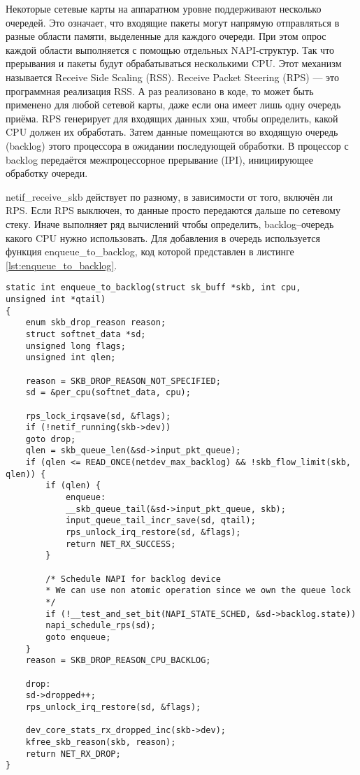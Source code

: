 Некоторые сетевые карты на аппаратном уровне поддерживают несколько очередей. Это означает, что входящие пакеты могут напрямую отправляться в разные области памяти, выделенные для каждого очереди. При этом опрос каждой области выполняется с помощью отдельных NAPI-структур. Так что прерывания и пакеты будут обрабатываться несколькими CPU. Этот механизм называется Receive Side Scaling (RSS). Receive Packet Steering (RPS) --- это программная реализация RSS. А раз реализовано в коде, то может быть применено для любой сетевой карты, даже если она имеет лишь одну очередь приёма. RPS генерирует для входящих данных хэш, чтобы определить, какой CPU должен их обработать. Затем данные помещаются во входящую очередь (backlog) этого процессора в ожидании последующей обработки. В процессор с backlog передаётся межпроцессорное прерывание (IPI), инициирующее обработку очереди.

netif\_receive\_skb действует по разному, в зависимости от того, включён ли RPS. Если RPS выключен, то данные просто передаются дальше по сетевому стеку. Иначе выполняет ряд вычислений чтобы определить, backlog--очередь какого CPU нужно использовать. Для добавления в очередь используется функция enqueue\_to\_backlog, код которой представлен в листинге \ref{lst:enqueue_to_backlog}.

\begin{center}
	\captionsetup{justification=raggedright,singlelinecheck=off}
	\begin{lstlisting}[label=lst:enqueue_to_backlog,caption=Код функции enqueue\_to\_backlog,showstringspaces=false]
static int enqueue_to_backlog(struct sk_buff *skb, int cpu,
unsigned int *qtail)
{
	enum skb_drop_reason reason;
	struct softnet_data *sd;
	unsigned long flags;
	unsigned int qlen;
	
	reason = SKB_DROP_REASON_NOT_SPECIFIED;
	sd = &per_cpu(softnet_data, cpu);
	
	rps_lock_irqsave(sd, &flags);
	if (!netif_running(skb->dev))
	goto drop;
	qlen = skb_queue_len(&sd->input_pkt_queue);
	if (qlen <= READ_ONCE(netdev_max_backlog) && !skb_flow_limit(skb, qlen)) {
		if (qlen) {
			enqueue:
			__skb_queue_tail(&sd->input_pkt_queue, skb);
			input_queue_tail_incr_save(sd, qtail);
			rps_unlock_irq_restore(sd, &flags);
			return NET_RX_SUCCESS;
		}
		
		/* Schedule NAPI for backlog device
		* We can use non atomic operation since we own the queue lock
		*/
		if (!__test_and_set_bit(NAPI_STATE_SCHED, &sd->backlog.state))
		napi_schedule_rps(sd);
		goto enqueue;
	}
	reason = SKB_DROP_REASON_CPU_BACKLOG;
	
	drop:
	sd->dropped++;
	rps_unlock_irq_restore(sd, &flags);
	
	dev_core_stats_rx_dropped_inc(skb->dev);
	kfree_skb_reason(skb, reason);
	return NET_RX_DROP;
}
	\end{lstlisting}
\end{center}
\FloatBarrier

